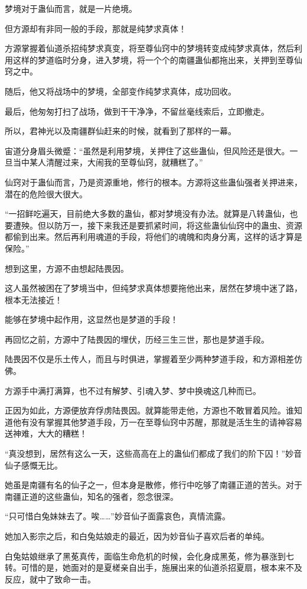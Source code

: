 \begin{this_body}
梦境对于蛊仙而言，就是一片绝境。

但方源却有非同一般的手段，那就是纯梦求真体！

方源掌握着仙道杀招纯梦求真变，将至尊仙窍中的梦境转变成纯梦求真体，然后利用这样的梦道临时分身，进入梦境，将一个个的南疆蛊仙都拖出来，关押到至尊仙窍之中。

随后，他又将战场中的梦境，全部变作纯梦求真体，成功回收。

最后，他匆匆打扫了战场，做到干干净净，不留丝毫线索后，立即撤走。

所以，君神光以及南疆群仙赶来的时候，就看到了那样的一幕。

宙道分身眉头微蹙：“虽然是利用梦境，关押住了这些蛊仙，但风险还是很大。一旦当中某人清醒过来，大闹我的至尊仙窍，就糟糕了。”

仙窍对于蛊仙而言，乃是资源重地，修行的根本。方源将这些蛊仙强者关押进来，潜在的危险很大很大。

“一招鲜吃遍天，目前绝大多数的蛊仙，都对梦境没有办法。就算是八转蛊仙，也要遭殃。但以防万一，接下来我还是要抓紧时间，将这些蛊仙仙窍中的蛊虫、资源都偷到出来。然后再利用魂道的手段，将他们的魂魄和肉身分离，这样的话才算是保险。”

想到这里，方源不由想起陆畏因。

这人虽然被困在了梦境当中，但纯梦求真体想要拖他出来，居然在梦境中迷了路，根本无法接近！

能够在梦境中起作用，这显然也是梦道的手段！

再回忆之前，方源中了陆畏因的埋伏，历经三生三世，那也是梦道手段。

陆畏因不仅是乐土传人，而且与时俱进，掌握着至少两种梦道手段，和方源相差仿佛。

方源手中满打满算，也不过有解梦、引魂入梦、梦中换魂这几种而已。

正因为如此，方源便放弃俘虏陆畏因。就算能带走他，方源也不敢冒着风险。谁知道他有没有掌握其他梦道手段，万一在至尊仙窍中苏醒，那就是活生生的请神容易送神难，大大的糟糕！

“真没想到，居然有这么一天，这些高高在上的蛊仙们都成了我们的阶下囚！”妙音仙子感慨无比。

她虽是南疆有名的仙子之一，但本身是散修，修行中吃够了南疆正道的苦头。对于南疆正道的这些蛊仙，知名的强者，怨念很深。

“只可惜白兔妹妹去了。唉……”妙音仙子面露哀色，真情流露。

她加入影宗之后，和白兔姑娘走的最近，因为妙音仙子喜欢后者的单纯。

白兔姑娘继承了黑莬真传，面临生命危机的时候，会化身成黑莬，修为暴涨到七转。可惜的是，她面对的是夏槎亲自出手，施展出来的仙道杀招夏扇，根本来不及反应，就中了致命一击。


\end{this_body}

